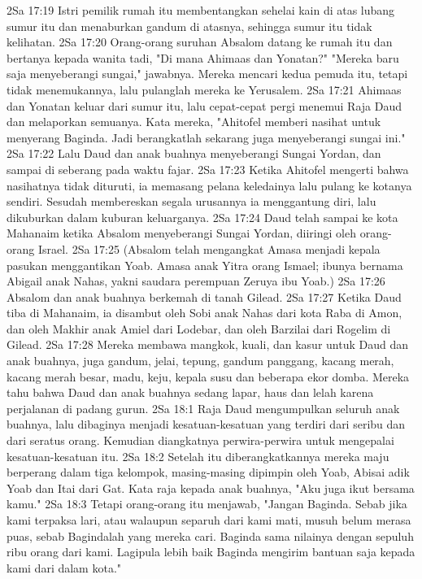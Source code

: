 2Sa 17:19  Istri pemilik rumah itu membentangkan sehelai kain di atas lubang sumur itu dan menaburkan gandum di atasnya, sehingga sumur itu tidak kelihatan.
2Sa 17:20  Orang-orang suruhan Absalom datang ke rumah itu dan bertanya kepada wanita tadi, "Di mana Ahimaas dan Yonatan?" "Mereka baru saja menyeberangi sungai," jawabnya. Mereka mencari kedua pemuda itu, tetapi tidak menemukannya, lalu pulanglah mereka ke Yerusalem.
2Sa 17:21  Ahimaas dan Yonatan keluar dari sumur itu, lalu cepat-cepat pergi menemui Raja Daud dan melaporkan semuanya. Kata mereka, "Ahitofel memberi nasihat untuk menyerang Baginda. Jadi berangkatlah sekarang juga menyeberangi sungai ini."
2Sa 17:22  Lalu Daud dan anak buahnya menyeberangi Sungai Yordan, dan sampai di seberang pada waktu fajar.
2Sa 17:23  Ketika Ahitofel mengerti bahwa nasihatnya tidak dituruti, ia memasang pelana keledainya lalu pulang ke kotanya sendiri. Sesudah membereskan segala urusannya ia menggantung diri, lalu dikuburkan dalam kuburan keluarganya.
2Sa 17:24  Daud telah sampai ke kota Mahanaim ketika Absalom menyeberangi Sungai Yordan, diiringi oleh orang-orang Israel.
2Sa 17:25  (Absalom telah mengangkat Amasa menjadi kepala pasukan menggantikan Yoab. Amasa anak Yitra orang Ismael; ibunya bernama Abigail anak Nahas, yakni saudara perempuan Zeruya ibu Yoab.)
2Sa 17:26  Absalom dan anak buahnya berkemah di tanah Gilead.
2Sa 17:27  Ketika Daud tiba di Mahanaim, ia disambut oleh Sobi anak Nahas dari kota Raba di Amon, dan oleh Makhir anak Amiel dari Lodebar, dan oleh Barzilai dari Rogelim di Gilead.
2Sa 17:28  Mereka membawa mangkok, kuali, dan kasur untuk Daud dan anak buahnya, juga gandum, jelai, tepung, gandum panggang, kacang merah, kacang merah besar, madu, keju, kepala susu dan beberapa ekor domba. Mereka tahu bahwa Daud dan anak buahnya sedang lapar, haus dan lelah karena perjalanan di padang gurun.
2Sa 18:1  Raja Daud mengumpulkan seluruh anak buahnya, lalu dibaginya menjadi kesatuan-kesatuan yang terdiri dari seribu dan dari seratus orang. Kemudian diangkatnya perwira-perwira untuk mengepalai kesatuan-kesatuan itu.
2Sa 18:2  Setelah itu diberangkatkannya mereka maju berperang dalam tiga kelompok, masing-masing dipimpin oleh Yoab, Abisai adik Yoab dan Itai dari Gat. Kata raja kepada anak buahnya, "Aku juga ikut bersama kamu."
2Sa 18:3  Tetapi orang-orang itu menjawab, "Jangan Baginda. Sebab jika kami terpaksa lari, atau walaupun separuh dari kami mati, musuh belum merasa puas, sebab Bagindalah yang mereka cari. Baginda sama nilainya dengan sepuluh ribu orang dari kami. Lagipula lebih baik Baginda mengirim bantuan saja kepada kami dari dalam kota."
